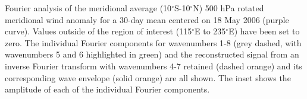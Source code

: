 \label{fig:transform}
Fourier analysis of the meridional average (10$^{\circ}$S-10$^{\circ}$N) 500 hPa rotated meridional wind anomaly for a 30-day mean centered on 18 May 2006 (purple curve). Values outside of the region of interest (115$^{\circ}$E to 235$^{\circ}$E) have been set to zero. The individual Fourier components for wavenumbers 1-8 (grey dashed, with wavenumbers 5 and 6 highlighted in green) and the reconstructed signal from an inverse Fourier transform with wavenumbers 4-7 retained (dashed orange) and its corresponding wave envelope (solid orange) are all shown. The inset shows the amplitude of each of the individual Fourier components. 